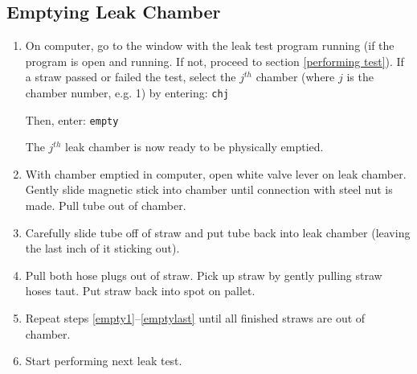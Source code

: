 \documentclass[letterpaper c,12pt]{article}
\begin{document}
\subsection{Emptying Leak Chamber}
	\begin{enumerate}
		\item On computer, go to the window with the leak test program running (if the program is open and running. If not, proceed to section \ref{performing test}). If a straw passed or failed the test, select the $j^{th}$ chamber (where $j$ is the chamber number, e.g. 1) by entering: \texttt{chj} 
		
Then, enter: \texttt{empty}

The $j^{th}$ leak chamber is now ready to be physically emptied. \label{empty1}

	\item With chamber emptied in computer, open white valve lever on leak chamber. Gently slide magnetic stick into chamber until connection with steel nut is made. Pull tube out of chamber.
	\item Carefully slide tube off of straw and put tube back into leak chamber (leaving the last inch of it sticking out). 
	\item Pull both hose plugs out of straw. Pick up straw by gently pulling straw hoses taut. Put straw back into spot on pallet. \label{emptylast}
	\item Repeat steps \ref{empty1}--\ref{emptylast} until all finished straws are out of chamber.
	\item Start performing next leak test.
	
\end{enumerate}
\end{document}
